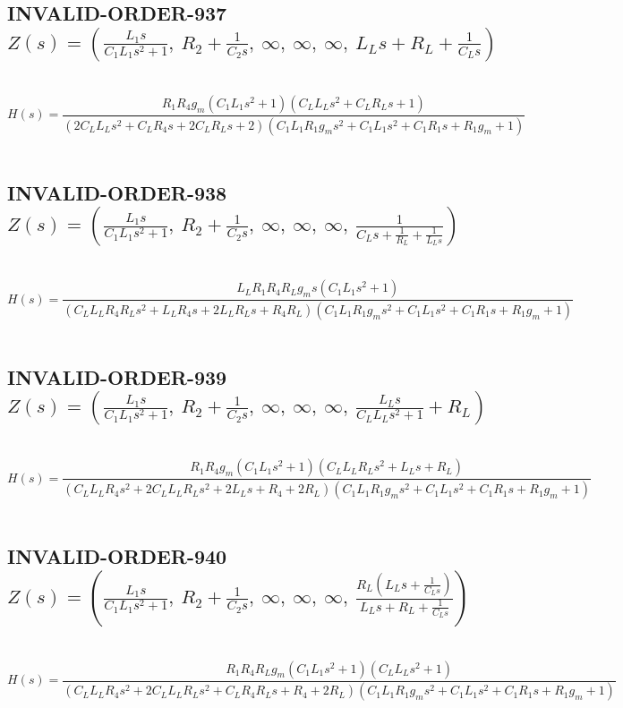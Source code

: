 \documentclass{article}
\begin{document}
\subsection{INVALID-ORDER-937 $Z(s) = \left( \frac{L_{1} s}{C_{1} L_{1} s^{2} + 1}, \  R_{2} + \frac{1}{C_{2} s}, \  \infty, \  \infty, \  \infty, \  L_{L} s + R_{L} + \frac{1}{C_{L} s}\right)$ } \ 
\textbf{\[H(s) = \frac{R_{1} R_{4} g_{m} \left(C_{1} L_{1} s^{2} + 1\right) \left(C_{L} L_{L} s^{2} + C_{L} R_{L} s + 1\right)}{\left(2 C_{L} L_{L} s^{2} + C_{L} R_{4} s + 2 C_{L} R_{L} s + 2\right) \left(C_{1} L_{1} R_{1} g_{m} s^{2} + C_{1} L_{1} s^{2} + C_{1} R_{1} s + R_{1} g_{m} + 1\right)}\] } \ 
\subsection{INVALID-ORDER-938 $Z(s) = \left( \frac{L_{1} s}{C_{1} L_{1} s^{2} + 1}, \  R_{2} + \frac{1}{C_{2} s}, \  \infty, \  \infty, \  \infty, \  \frac{1}{C_{L} s + \frac{1}{R_{L}} + \frac{1}{L_{L} s}}\right)$ } \ 
\textbf{\[H(s) = \frac{L_{L} R_{1} R_{4} R_{L} g_{m} s \left(C_{1} L_{1} s^{2} + 1\right)}{\left(C_{L} L_{L} R_{4} R_{L} s^{2} + L_{L} R_{4} s + 2 L_{L} R_{L} s + R_{4} R_{L}\right) \left(C_{1} L_{1} R_{1} g_{m} s^{2} + C_{1} L_{1} s^{2} + C_{1} R_{1} s + R_{1} g_{m} + 1\right)}\] } \ 
\subsection{INVALID-ORDER-939 $Z(s) = \left( \frac{L_{1} s}{C_{1} L_{1} s^{2} + 1}, \  R_{2} + \frac{1}{C_{2} s}, \  \infty, \  \infty, \  \infty, \  \frac{L_{L} s}{C_{L} L_{L} s^{2} + 1} + R_{L}\right)$ } \ 
\textbf{\[H(s) = \frac{R_{1} R_{4} g_{m} \left(C_{1} L_{1} s^{2} + 1\right) \left(C_{L} L_{L} R_{L} s^{2} + L_{L} s + R_{L}\right)}{\left(C_{L} L_{L} R_{4} s^{2} + 2 C_{L} L_{L} R_{L} s^{2} + 2 L_{L} s + R_{4} + 2 R_{L}\right) \left(C_{1} L_{1} R_{1} g_{m} s^{2} + C_{1} L_{1} s^{2} + C_{1} R_{1} s + R_{1} g_{m} + 1\right)}\] } \ 
\subsection{INVALID-ORDER-940 $Z(s) = \left( \frac{L_{1} s}{C_{1} L_{1} s^{2} + 1}, \  R_{2} + \frac{1}{C_{2} s}, \  \infty, \  \infty, \  \infty, \  \frac{R_{L} \left(L_{L} s + \frac{1}{C_{L} s}\right)}{L_{L} s + R_{L} + \frac{1}{C_{L} s}}\right)$ } \ 
\textbf{\[H(s) = \frac{R_{1} R_{4} R_{L} g_{m} \left(C_{1} L_{1} s^{2} + 1\right) \left(C_{L} L_{L} s^{2} + 1\right)}{\left(C_{L} L_{L} R_{4} s^{2} + 2 C_{L} L_{L} R_{L} s^{2} + C_{L} R_{4} R_{L} s + R_{4} + 2 R_{L}\right) \left(C_{1} L_{1} R_{1} g_{m} s^{2} + C_{1} L_{1} s^{2} + C_{1} R_{1} s + R_{1} g_{m} + 1\right)}\] } \ 
\end{document}
